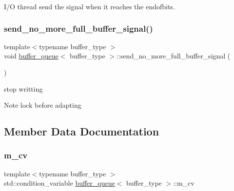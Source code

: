 I/O thread send the signal when it reaches the endofbits. 

\mbox{\label{structbuffer__queue_a487335f8827c09d4d76d588e47d633ac}} 
\subsubsection{\texorpdfstring{send\+\_\+no\+\_\+more\+\_\+full\+\_\+buffer\+\_\+signal()}{send\_no\_more\_full\_buffer\_signal()}\hspace{0.1cm}{\footnotesize\ttfamily [2/2]}}
{\footnotesize\ttfamily template$<$typename buffer\+\_\+type $>$ \\
void \hyperlink{structbuffer__queue}{buffer\+\_\+queue}$<$ buffer\+\_\+type $>$\+::send\+\_\+no\+\_\+more\+\_\+full\+\_\+buffer\+\_\+signal (\begin{DoxyParamCaption}{ }\end{DoxyParamCaption})\hspace{0.3cm}{\ttfamily [inline]}}



stop writting 

\begin{DoxyNote}{Note}
lock before adapting 
\end{DoxyNote}


\subsection{Member Data Documentation}
\mbox{\label{structbuffer__queue_a65f560d9b82c5154044243c21867a773}} 
\subsubsection{\texorpdfstring{m\+\_\+cv}{m\_cv}}
{\footnotesize\ttfamily template$<$typename buffer\+\_\+type $>$ \\
std\+::condition\+\_\+variable \hyperlink{structbuffer__queue}{buffer\+\_\+queue}$<$ buffer\+\_\+type $>$\+::m\+\_\+cv}



